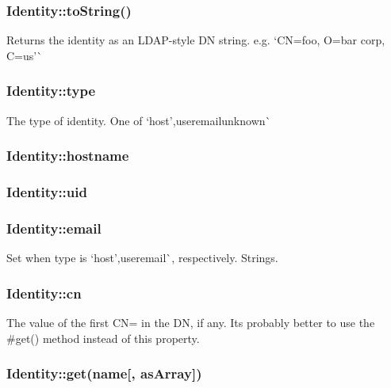 \subsubsection*{{\ttfamily Identity\+::to\+String()}}

Returns the identity as an L\+D\+A\+P-\/style DN string. e.\+g. `\textquotesingle{}CN=foo, O=bar corp, C=us'\`{}

\subsubsection*{{\ttfamily Identity\+::type}}

The type of identity. One of `\textquotesingle{}host'{\ttfamily ,}\textquotesingle{}user\textquotesingle{}{\ttfamily ,}\textquotesingle{}email\textquotesingle{}unknown\textquotesingle{}\`{}

\subsubsection*{{\ttfamily Identity\+::hostname}}

\subsubsection*{{\ttfamily Identity\+::uid}}

\subsubsection*{{\ttfamily Identity\+::email}}

Set when {\ttfamily type} is `\textquotesingle{}host'{\ttfamily ,}\textquotesingle{}user\textquotesingle{}email\textquotesingle{}\`{}, respectively. Strings.

\subsubsection*{{\ttfamily Identity\+::cn}}

The value of the first {\ttfamily CN=} in the DN, if any. It\textquotesingle{}s probably better to use the {\ttfamily \#get()} method instead of this property.

\subsubsection*{{\ttfamily Identity\+::get(name\mbox{[}, as\+Array\mbox{]})}}


